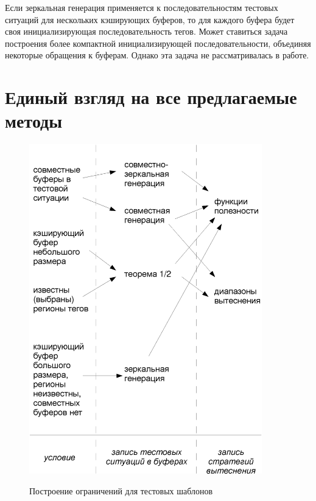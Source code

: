 Если зеркальная генерация применяется к последовательностям тестовых
ситуаций для нескольких кэширующих буферов, то для каждого буфера
будет своя инициализирующая последовательность тегов. Может
ставиться задача построения более компактной инициализирующей
последовательности, объединяя некоторые обращения к буферам. Однако
эта задача не рассматривалась в работе.

\section{Единый взгляд на все предлагаемые методы}

\begin{figure}[p]
  \includegraphics[width=0.9\textwidth]{2.theor/methods}\\
  \caption{Построение ограничений для тестовых шаблонов}\label{methods}
\end{figure}

